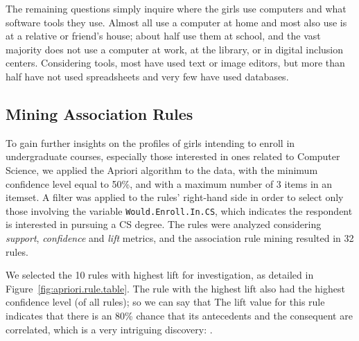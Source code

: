 The remaining questions simply inquire where the girls use computers and what software tools they use. Almost all use a computer at home and most also use is at a relative or friend's house; about half use them at school, and the vast majority does not use a computer at work, at the library, or in digital inclusion centers. Considering tools, most have used text or image editors, but more than half have not used spreadsheets and very few have used databases.

\subsection{Mining Association Rules}\label{sec:perception:mining}%
To gain further insights on the profiles of girls intending to enroll in undergraduate courses, especially those interested in ones related to Computer Science, we applied the Apriori algorithm to the data, with the minimum confidence level equal to 50\%, and with a maximum number of 3 items in an itemset. A filter was applied to the rules' right-hand side in order to select only those involving the variable \texttt{Would.Enroll.In.CS}, which indicates the respondent is interested in pursuing a CS degree. The rules were analyzed considering \emph{support}, \emph{confidence} and \emph{lift} metrics, and the association rule mining resulted in 32 rules.

We selected the 10 rules with highest lift for investigation, as detailed in Figure~\ref{fig:apriori.rule.table}.  The rule with the highest lift also had the highest confidence level (of all rules); so we can say that  The lift value for this rule indicates that there is an 80\% chance that its antecedents and the consequent are correlated, which is a very intriguing discovery: .

